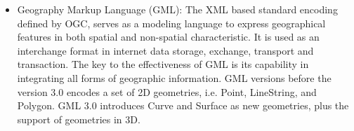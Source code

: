 \documentclass[a4paper,12pt]{article}
\begin{document}
\begin{itemize}


\item Geography Markup Language (GML): The XML based standard encoding defined by OGC, serves as a modeling language to express geographical features in both spatial and non-spatial characteristic. It is used as an interchange format in internet data storage, exchange, transport and transaction. The key to the effectiveness of GML is its capability in integrating all forms of geographic information. %
GML versions before the version 3.0 encodes a set of 2D geometries, i.e. Point, LineString, and Polygon. GML 3.0 introduces Curve and Surface as new geometries, plus the support of geometries in 3D.


\end{itemize}
\end{document}
